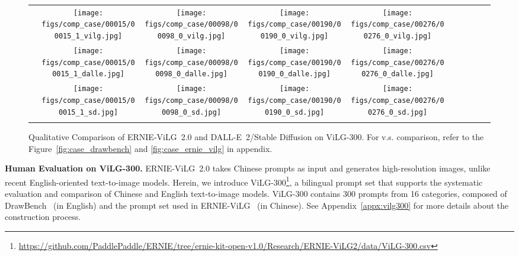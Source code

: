 \documentclass[10pt,twocolumn,letterpaper]{article}
\begin{document}
\begin{CJK*}{UTF8}{gbsn}
\begin{figure}[t]
    \centering
    \setlength{\tabcolsep}{2pt}
    \begin{tabular}{cccccccccc}
         &
        \texttt{[image: figs/comp\_case/00015/00015\_1\_vilg.jpg]} &
        \texttt{[image: figs/comp\_case/00098/00098\_0\_vilg.jpg]} &
        \texttt{[image: figs/comp\_case/00190/00190\_0\_vilg.jpg]} &
        \texttt{[image: figs/comp\_case/00276/00276\_0\_vilg.jpg]}
        \\
         &
        \texttt{[image: figs/comp\_case/00015/00015\_1\_dalle.jpg]} &
        \texttt{[image: figs/comp\_case/00098/00098\_0\_dalle.jpg]} &
        \texttt{[image: figs/comp\_case/00190/00190\_0\_dalle.jpg]} &
        \texttt{[image: figs/comp\_case/00276/00276\_0\_dalle.jpg]}
        \\
         &
        \texttt{[image: figs/comp\_case/00015/00015\_1\_sd.jpg]} &
        \texttt{[image: figs/comp\_case/00098/00098\_0\_sd.jpg]} &
        \texttt{[image: figs/comp\_case/00190/00190\_0\_sd.jpg]} &
        \texttt{[image: figs/comp\_case/00276/00276\_0\_sd.jpg]}
        \\
        & 
        &
    \end{tabular}
    \caption{Qualitative Comparison of ERNIE-ViLG~2.0 and DALL-E~2/Stable Diffusion on ViLG-300. For  v.s.  comparison, refer to the Figure~\ref{fig:case_drawbench} and \ref{fig:case_ernie_vilg} in appendix.}
    \label{fig:main_case}
\end{figure}
\end{CJK*}

 
\noindent\textbf{Human Evaluation on ViLG-300.}
ERNIE-ViLG~2.0 takes Chinese prompts as input and generates high-resolution images, unlike recent English-oriented text-to-image models.
Herein, we introduce ViLG-300\footnote{\url{https://github.com/PaddlePaddle/ERNIE/tree/ernie-kit-open-v1.0/Research/ERNIE-ViLG2/data/ViLG-300.csv}}, a bilingual prompt set that supports the systematic evaluation and comparison of Chinese and English text-to-image models.
ViLG-300 contains 300 prompts from 16 categories, composed of DrawBench~\cite{DBLP:journals/corr/abs-2205-11487} (in English) and the prompt set used in ERNIE-ViLG~\cite{DBLP:journals/corr/abs-2112-15283} (in Chinese). 
See Appendix~\ref{appx:vilg300} for more details about the construction process. 
\end{document}
